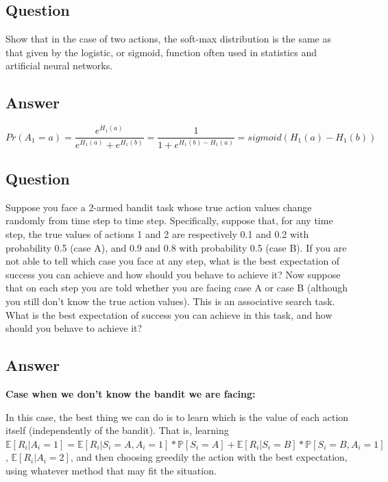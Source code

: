 \documentclass{article}
\begin{document}
    \subsection{Question}
    Show that in the case of two actions, the soft-max distribution is the same as that given by the logistic, or sigmoid, function often used in statistics and artificial neural networks.

    \subsection*{Answer}
    \begin{equation}
        Pr(A_1=a)=\frac{e^{H_{1}(a)}}{ e^{H_{1}(a)}+e^{H_{1}(b)} } = \frac{1}{ 1+e^{H_{1}(b)-H_{1}(a)} } = sigmoid(H_{1}(a)-H_{1}(b))
    \end{equation}

    \subsection{Question}
    Suppose you face a 2-armed bandit task whose true action values change randomly from time step to time step.
    Specifically, suppose that, for any time step, the true values of actions 1 and 2 are respectively 0.1 and 0.2 with probability 0.5 (case A), and 0.9 and 0.8 with probability 0.5 (case B).
    If you are not able to tell which case you face at any step, what is the best expectation of success you can achieve and how should you behave to achieve it?
    Now suppose that on each step you are told whether you are facing case A or case B (although you still don’t know the true action values).
    This is an associative search task.
    What is the best expectation of success you can achieve in this task, and how should you behave to achieve it?

    \subsection*{Answer}
    
{\bf Case when we don't know the bandit we are facing:}

In this case, the best thing we can do is to learn which is the value of each action itself (independently of the bandit). That is, learning $\mathbb{E}[R_i|A_i=1]=\mathbb{E}[R_i|S_i = A, A_i=1]*\mathbb{P}[S_i = A] + \mathbb{E}[R_i|S_i = B]*\mathbb{P}[S_i = B, A_i=1]$, $\mathbb{E}[R_i|A_i=2]$, and then choosing greedily the action with the best expectation, using whatever method that may fit the situation.
\end{document}
